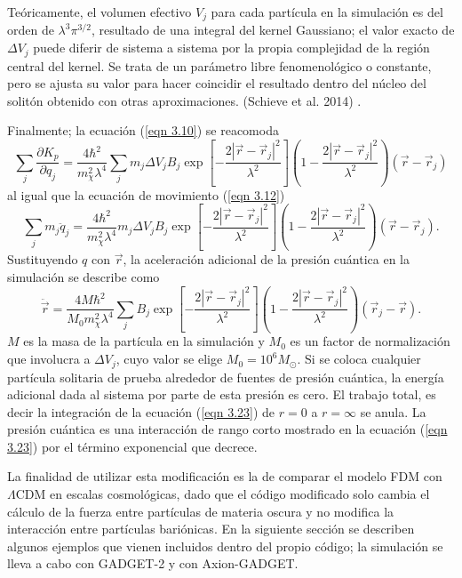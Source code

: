 \documentclass[a4paper,openright,12pt]{book}
\begin{document}
Teóricamente, el volumen efectivo $V_{j}$ para cada partícula en la simulación es del orden de $\lambda^{3}\pi^{3/2}$, resultado de una integral del kernel Gaussiano; el valor exacto de $\Delta V_{j}$ puede diferir de  sistema a sistema por la propia complejidad de la región central del kernel. Se trata de un parámetro libre fenomenológico o constante, pero se ajusta su valor para hacer coincidir el resultado dentro del núcleo del solitón obtenido con otras aproximaciones. (Schieve et al. 2014) \cite{3.5}.

Finalmente; la ecuación (\ref{eqn 3.10}) se reacomoda
\begin{equation}
\sum_{j} \frac{\partial K_{p}}{\partial q_{j}}
=
\frac{4\hbar^{2}}{m_{\chi}^{2}\lambda^{4}}
\sum_{j}m_{j}\Delta V_{j}B_{j}
\exp\left[
-\frac{2|\vec{r}-\vec{r}_{j}|^{2}}{\lambda^{2}}\right]
\left(1-\frac{2|\vec{r}-\vec{r}_{j}|^{2}}{\lambda^{2}}\right)
(\vec{r}-\vec{r}_{j})\label{eqn 3.21}
\end{equation}
al igual que la ecuación de movimiento (\ref{eqn 3.12})
\begin{equation}
\sum_{j}m_{j}\ddot{q}_{j}
=
\frac{4\hbar^{2}}{m_{\chi}^{2}\lambda^{4}}
m_{j}\Delta V_{j}B_{j}
\exp\left[
-\frac{2|\vec{r}-\vec{r}_{j}|^{2}}{\lambda^{2}}\right]
\left(1-\frac{2|\vec{r}-\vec{r}_{j}|^{2}}{\lambda^{2}}\right)
(\vec{r}-\vec{r}_{j}).\label{eqn 3.22}
\end{equation}
Sustituyendo $q$ con $\vec{r}$, la aceleración adicional de la presión cuántica en la simulación se describe como
\begin{equation}
\ddot{\vec{r}}
=
\frac{4M\hbar^{2}}{M_{0}m_{\chi}^{2}\lambda^{4}}
\sum_{j}B_{j}
\exp\left[
-\frac{2|\vec{r}-\vec{r}_{j}|^{2}}{\lambda^{2}}\right]
\left(1-\frac{2|\vec{r}-\vec{r}_{j}|^{2}}{\lambda^{2}}\right)
(\vec{r}_{j}-\vec{r}).\label{eqn 3.23}
\end{equation}
$M$ es la masa de la partícula en la simulación y $M_{0}$ es un factor de normalización que involucra a $\Delta V_{j}$, cuyo valor se elige $M_{0} = 10^{6} M_{\odot}$. Si se coloca cualquier partícula solitaria de prueba alrededor de fuentes de presión cuántica, la energía adicional dada al sistema por parte de esta presión es cero. El trabajo total, es decir la integración de la ecuación (\ref{eqn 3.23}) de $r=0$ a $r=\infty$ se anula. La presión cuántica es una interacción de rango corto mostrado en la ecuación (\ref{eqn 3.23}) por el término exponencial que decrece.

La finalidad de utilizar esta modificación es la de comparar el modelo FDM con $\Lambda$CDM en escalas cosmológicas, dado que el código modificado solo cambia el cálculo de la fuerza entre partículas de materia oscura y no modifica la interacción entre partículas bariónicas. En la siguiente sección se describen algunos ejemplos que vienen incluidos dentro del propio código; la simulación se lleva a cabo con GADGET-2 y con Axion-GADGET.
\end{document}
